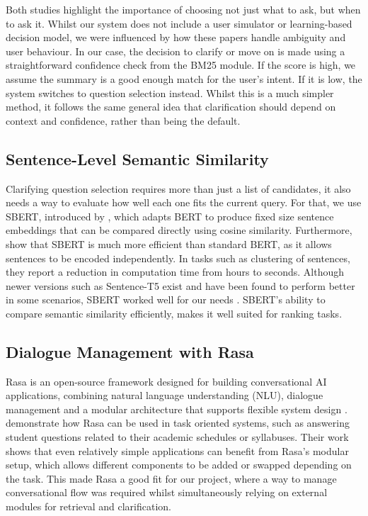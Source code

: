 \documentclass[11pt]{article}
\begin{document}
Both studies highlight the importance of choosing not just what to ask, but when to ask it. Whilst our system does not include a user simulator or learning-based decision model, we were influenced by how these papers handle ambiguity and user behaviour. In our case, the decision to clarify or move on is made using a straightforward confidence check from the BM25 module. If the score is high, we assume the summary is a good enough match for the user's intent. If it is low, the system switches to question selection instead. Whilst this is a much simpler method, it follows the same general idea that clarification should depend on context and confidence, rather than being the default.

\subsection{Sentence-Level Semantic Similarity}
Clarifying question selection requires more than just a list of candidates, it also needs a way to evaluate how well each one fits the current query. For that, we use SBERT, introduced by \citet{Reimers2019}, which adapts BERT to produce fixed size sentence embeddings that can be compared directly using cosine similarity. Furthermore, \citeauthor{Reimers2019} show that SBERT is much more efficient than standard BERT, as it allows sentences to be encoded independently. In tasks such as clustering of sentences, they report a reduction in computation time from hours to seconds. Although newer versions such as Sentence-T5 exist and have been found to perform better in some scenarios, SBERT worked well for our needs \cite{Ni2021}. SBERT's ability to compare semantic similarity efficiently, makes it well suited for ranking tasks.

\subsection{Dialogue Management with Rasa}
Rasa is an open-source framework designed for building conversational AI applications, combining natural language understanding (NLU), dialogue management and a modular architecture that supports flexible system design \cite{Rasa2025,XaqtTeam2022}. \citet{Dinesh2021} demonstrate how Rasa can be used in task oriented systems, such as answering student questions related to their academic schedules or syllabuses. Their work shows that even relatively simple applications can benefit from Rasa's modular setup, which allows different components to be added or swapped depending on the task. This made Rasa a good fit for our project, where a way to manage conversational flow was required whilst simultaneously relying on external modules for retrieval and clarification.
\end{document}

